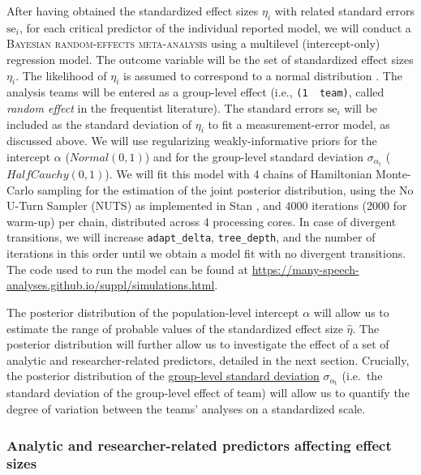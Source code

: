 \documentclass[Review,times,sageh]{sagej}
\begin{document}
After having obtained the standardized effect sizes \(\eta_i\) with related standard errors \(\text{se}_i\), for each critical predictor of the individual reported model, we will conduct a \textsc{Bayesian random-effects meta-analysis} using a multilevel (intercept-only) regression model.
The outcome variable will be the set of standardized effect sizes \(\eta_i\).
The likelihood of \(\eta_i\) is assumed to correspond to a normal distribution \citep{knight2000}.
The analysis teams will be entered as a group-level effect (i.e., \texttt{(1\ \textbar{}\ team)}, called \emph{random effect} in the frequentist literature).
The standard errors \(\text{se}_i\) will be included as the standard deviation of \(\eta_i\) to fit a measurement-error model, as discussed above.
We will use regularizing weakly-informative priors for the intercept \(\alpha\) (\(Normal(0, 1)\)) and for the group-level standard deviation \(\sigma_{\alpha_{\text{t}}}\) (\(HalfCauchy(0, 1)\)).
We will fit this model with 4 chains of Hamiltonian Monte-Carlo sampling for the estimation of the joint posterior distribution, using the No U-Turn Sampler (NUTS) as implemented in Stan \citep{stan2021}, and 4000 iterations (2000 for warm-up) per chain, distributed across 4 processing cores.
In case of divergent transitions, we will increase \texttt{adapt\_delta}, \texttt{tree\_depth}, and the number of iterations in this order until we obtain a model fit with no divergent transitions.
The code used to run the model can be found at \url{https://many-speech-analyses.github.io/suppl/simulations.html}.

The posterior distribution of the population-level intercept \(\alpha\) will allow us to estimate the range of probable values of the standardized effect size \(\hat{\eta}\).
The posterior distribution will further allow us to investigate the effect of a set of analytic and researcher-related predictors, detailed in the next section.
Crucially, the posterior distribution of the \href{.smallcaps}{group-level standard deviation} \(\sigma_{\alpha_{\text{t}}}\) (i.e.~the standard deviation of the group-level effect of team) will allow us to quantify the degree of variation between the teams' analyses on a standardized scale.

\hypertarget{anares-preds}{%
\subsubsection{Analytic and researcher-related predictors affecting effect sizes}\label{anares-preds}}
\end{document}

